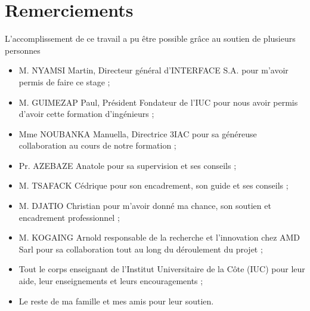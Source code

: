 \chapter*{Remerciements}%
%

L’accomplissement de ce travail a pu être possible grâce au soutien de plusieurs personnes
\begin{itemize}
    \item M. NYAMSI Martin, Directeur général d'INTERFACE S.A. pour m'avoir permis de faire ce stage ;
    \item M. GUIMEZAP Paul, Président Fondateur de l'IUC pour nous avoir permis d’avoir cette formation d’ingénieurs ;
    \item Mme NOUBANKA Manuella, Directrice 3IAC pour sa généreuse collaboration au cours de notre formation ;
    \item Pr. AZEBAZE Anatole pour sa supervision et ses conseils ;
    \item M. TSAFACK Cédrique pour son encadrement, son guide et ses conseils ;
    \item M. DJATIO Christian pour m’avoir donné ma chance, son soutien et encadrement professionnel ;
    \item M. KOGAING Arnold responsable de la recherche et l'innovation chez AMD Sarl pour sa collaboration tout au long du déroulement du projet ;
    \item Tout le corps enseignant de l'Institut Universitaire de la Côte (IUC) pour leur aide, leur enseignements et leurs encouragements ;
    \item Le reste de ma famille et mes amis pour leur soutien.
\end{itemize}
